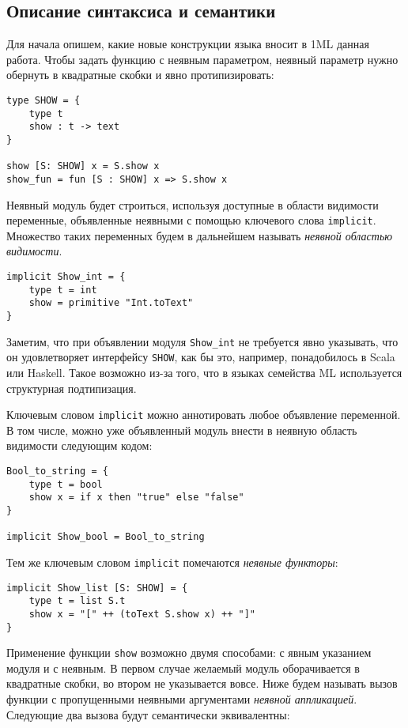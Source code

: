 \documentclass[../diploma.tex]{subfiles}
\begin{document}
\label{sec:1}

\subsection{Описание синтаксиса и семантики}

Для начала опишем, какие новые конструкции языка вносит в 1ML данная работа. Чтобы задать функцию с неявным параметром, неявный параметр нужно обернуть в квадратные скобки и явно протипизировать:

\begin{verbatim}
type SHOW = {
    type t
    show : t -> text
}

show [S: SHOW] x = S.show x
show_fun = fun [S : SHOW] x => S.show x
\end{verbatim}

Неявный модуль будет строиться, используя доступные в области видимости переменные, объявленные неявными с помощью ключевого слова \texttt{implicit}. Множество таких переменных будем в дальнейшем называть \textit{неявной областью видимости}.

\begin{verbatim}
implicit Show_int = {
    type t = int
    show = primitive "Int.toText"
}
\end{verbatim}

Заметим, что при объявлении модуля \texttt{Show\_int} не требуется явно указывать, что он удовлетворяет интерфейсу \texttt{SHOW}, как бы это, например, понадобилось в Scala или Haskell. Такое возможно из-за того, что в языках семейства ML используется структурная подтипизация.

Ключевым словом \texttt{implicit} можно аннотировать любое объявление переменной. В том числе, можно уже объявленный модуль внести в неявную область видимости следующим кодом:

\begin{verbatim}
Bool_to_string = {
    type t = bool
    show x = if x then "true" else "false"
}

implicit Show_bool = Bool_to_string
\end{verbatim}

Тем же ключевым словом \texttt{implicit} помечаются \textit{неявные функторы}:

\begin{verbatim}
implicit Show_list [S: SHOW] = {
    type t = list S.t
    show x = "[" ++ (toText S.show x) ++ "]"
}
\end{verbatim}

Применение функции \texttt{show} возможно двумя способами: с явным указанием модуля и с неявным. В первом случае желаемый модуль оборачивается в квадратные скобки, во втором не указывается вовсе. Ниже будем называть вызов функции с пропущенными неявными аргументами \textit{неявной аппликацией}. Следующие два вызова будут семантически эквивалентны:
\end{document}
